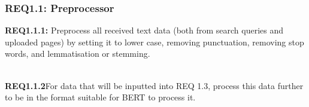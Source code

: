 \subsubsection{REQ1.1: Preprocessor}

\textbf{REQ1.1.1: }Preprocess all received text data (both from search queries and uploaded pages) by setting it to lower case, removing punctuation, removing stop words, and lemmatisation or stemming.\par
\textbf{\\REQ1.1.2}For data that will be inputted into REQ 1.3, process this data further to be in the format suitable for BERT to process it.\par
